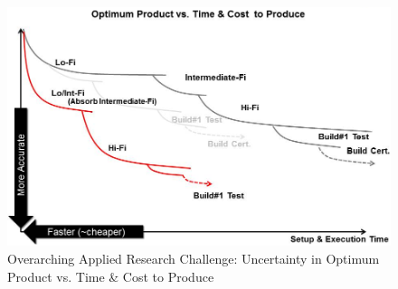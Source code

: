 \documentclass[heading.tex]{subfiles}
\begin{document}
\begin{figure}[hbtp]
\centering
\includegraphics[width=1.0\textwidth]{images/optimum_product_vs_time}
\caption{Overarching Applied Research Challenge: Uncertainty in Optimum Product vs. Time \& Cost to Produce}
\label{f:product_vs_time}
\end{figure}
\end{document}
